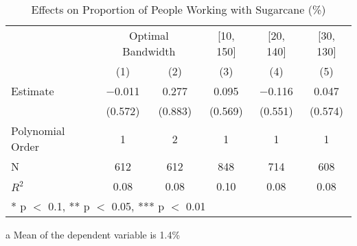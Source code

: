 \begin{table}[!h]

\caption{Effects on Proportion of People Working with Sugarcane (\%) \label{tab:rdd_sugarcane}}
\centering
\begin{threeparttable}
\begin{tabular}[t]{lccccc}
\toprule
\multicolumn{1}{c}{} & \multicolumn{2}{c}{Optimal Bandwidth} & \multicolumn{1}{c}{[10, 150]} & \multicolumn{1}{c}{[20, 140]} & \multicolumn{1}{c}{[30, 130]} \\
\cmidrule(l{3pt}r{3pt}){2-3} \cmidrule(l{3pt}r{3pt}){4-4} \cmidrule(l{3pt}r{3pt}){5-5} \cmidrule(l{3pt}r{3pt}){6-6}
  & (1) & (2) & (3) & (4) & (5)\\
\midrule
Estimate & \num{-0.011} & \num{0.277} & \num{0.095} & \num{-0.116} & \num{0.047}\\
 & (\num{0.572}) & (\num{0.883}) & (\num{0.569}) & (\num{0.551}) & (\num{0.574})\\

\midrule
Polynomial Order & 1 & 2 & 1 & 1 & 1\\
N & \num{612} & \num{612} & \num{848} & \num{714} & \num{608}\\
$R^2$ & \num{0.08} & \num{0.08} & \num{0.10} & \num{0.08} & \num{0.08}\\
\bottomrule
\multicolumn{6}{l}{\rule{0pt}{1em}* p $<$ 0.1, ** p $<$ 0.05, *** p $<$ 0.01}\\
\end{tabular}
\begin{tablenotes}
\item[a] Mean of the dependent variable is 1.4\%
\end{tablenotes}
\end{threeparttable}
\end{table}
